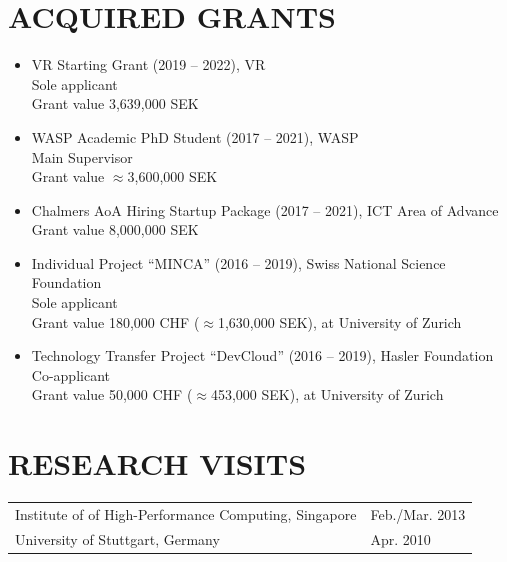 \documentclass[paper=letter,fontsize=11pt]{scrartcl} %
\newcommand{\NewPart}[2]{\section*{\uppercase{#1} #2}}
\begin{document}
\NewPart{Acquired Grants}{}

\begin{itemize}
  \item VR Starting Grant (2019 -- 2022), VR\\
  Sole applicant\\
	Grant value 3,639,000 SEK
  \item WASP Academic PhD Student (2017 -- 2021), WASP\\
  Main Supervisor\\
	Grant value $\approx$3,600,000 SEK
  \item Chalmers AoA Hiring Startup Package (2017 -- 2021), ICT Area of Advance\\
  Grant value 8,000,000 SEK
  \item Individual Project ``MINCA'' (2016 -- 2019), Swiss National Science Foundation\\
  Sole applicant \\
  Grant value 180,000 CHF ($\approx$1,630,000 SEK), at University of Zurich
  \item Technology Transfer Project ``DevCloud'' (2016 -- 2019), Hasler Foundation\\
  Co-applicant \\
  Grant value 50,000 CHF ($\approx$453,000 SEK), at University of Zurich
\end{itemize}

\NewPart{Research Visits}{}

  \begin{tabular}{p{12cm}l}
    Institute of of High-Performance Computing, Singapore & Feb./Mar. 2013 \\
    University of Stuttgart, Germany & Apr. 2010 \\
  \end{tabular}

%
%
\end{document}
